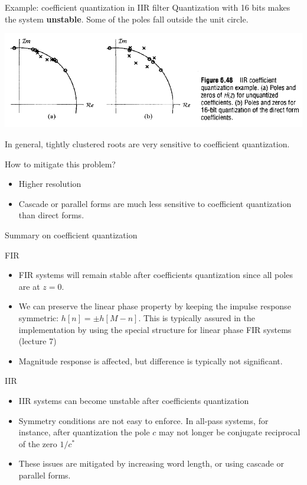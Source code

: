 \documentclass[10pt, handout]{beamer}
\begin{document}
\begin{frame}{Example: coefficient quantization in IIR filter}	
Quantization with 16 bits makes the system \textbf{unstable}. Some of the poles fall outside the unit circle.
\begin{center}
\includegraphics[width=\textwidth]{figs/iir_coeff_quantiz.png}
\end{center}	

\pause
In general, tightly clustered roots are very sensitive to coefficient quantization.

How to mitigate this problem?
\begin{itemize}
\item Higher resolution
\item Cascade or parallel forms are much less sensitive to coefficient quantization than direct forms.
\end{itemize}
\end{frame}


\begin{frame}{Summary on coefficient quantization}
\begin{block}{FIR}
	\begin{itemize}
		\item FIR systems will remain stable after coefficients quantization since all poles are at $z = 0$.
		\item We can preserve the linear phase property by keeping the impulse response symmetric: $h[n] = \pm h[M-n]$. This is typically assured in the implementation by using the special structure for linear phase FIR systems (lecture 7)
		\item Magnitude response is affected, but difference is typically not significant.
	\end{itemize}
\end{block}

\begin{block}{IIR}
	\begin{itemize}
		\item IIR systems can become unstable after coefficients quantization
		\item Symmetry conditions are not easy to enforce. In all-pass systems, for  instance, after quantization the pole $c$ may not longer be conjugate reciprocal of the zero $1/c^*$
		\item These issues are mitigated by increasing word length, or using cascade or parallel forms.
	\end{itemize}
\end{block}

\end{frame}
\end{document}
